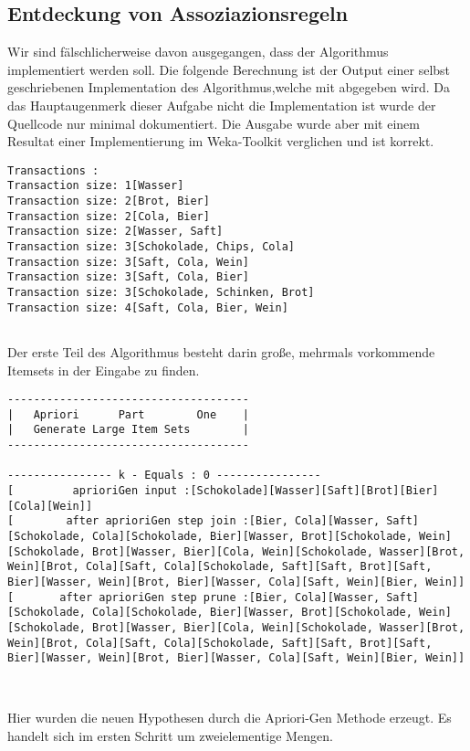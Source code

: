 \documentclass[a4paper]{article}
\begin{document}
\subsection{Entdeckung von Assoziazionsregeln}
Wir sind fälschlicherweise davon ausgegangen, dass der Algorithmus implementiert werden soll. Die folgende Berechnung ist der Output einer selbst geschriebenen Implementation des Algorithmus,welche mit abgegeben wird. Da das Hauptaugenmerk dieser Aufgabe nicht die Implementation ist wurde der Quellcode nur minimal dokumentiert. Die Ausgabe wurde aber mit einem Resultat einer Implementierung im Weka-Toolkit verglichen und ist korrekt.
\begin{lstlisting}
Transactions :
Transaction size: 1[Wasser]
Transaction size: 2[Brot, Bier]
Transaction size: 2[Cola, Bier]
Transaction size: 2[Wasser, Saft]
Transaction size: 3[Schokolade, Chips, Cola]
Transaction size: 3[Saft, Cola, Wein]
Transaction size: 3[Saft, Cola, Bier]
Transaction size: 3[Schokolade, Schinken, Brot]
Transaction size: 4[Saft, Cola, Bier, Wein]


\end{lstlisting}
Der erste Teil des Algorithmus besteht darin große, mehrmals vorkommende Itemsets in der Eingabe zu finden.
\begin{lstlisting}
-------------------------------------
|   Apriori 	 Part 	 	 One  	|
|   Generate Large Item Sets		|
-------------------------------------

---------------- k - Equals : 0 ----------------
[ 		  aprioriGen input :[Schokolade][Wasser][Saft][Brot][Bier][Cola][Wein]]
[ 		 after aprioriGen step join :[Bier, Cola][Wasser, Saft][Schokolade, Cola][Schokolade, Bier][Wasser, Brot][Schokolade, Wein][Schokolade, Brot][Wasser, Bier][Cola, Wein][Schokolade, Wasser][Brot, Wein][Brot, Cola][Saft, Cola][Schokolade, Saft][Saft, Brot][Saft, Bier][Wasser, Wein][Brot, Bier][Wasser, Cola][Saft, Wein][Bier, Wein]]
[ 		after aprioriGen step prune :[Bier, Cola][Wasser, Saft][Schokolade, Cola][Schokolade, Bier][Wasser, Brot][Schokolade, Wein][Schokolade, Brot][Wasser, Bier][Cola, Wein][Schokolade, Wasser][Brot, Wein][Brot, Cola][Saft, Cola][Schokolade, Saft][Saft, Brot][Saft, Bier][Wasser, Wein][Brot, Bier][Wasser, Cola][Saft, Wein][Bier, Wein]]



\end{lstlisting}
Hier wurden die neuen Hypothesen durch die Apriori-Gen Methode erzeugt. Es handelt sich im ersten Schritt um zweielementige Mengen. 
\end{document}
